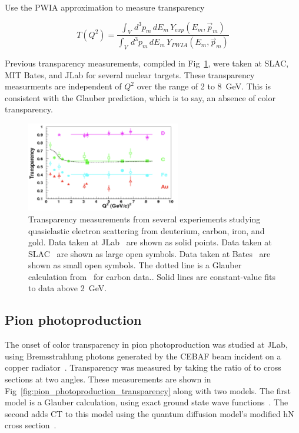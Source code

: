 Use the PWIA approximation to measure transparency

\begin{equation}
    T(Q^2) = \frac{\int_V \, d^3p_m \, dE_m \, Y_{exp}(E_m, \vec{p}_m)}
                  {\int_V \, d^3p_m \, dE_m \, Y_{PWIA}(E_m, \vec{p}_m)}
\end{equation}

Previous transparency measurements, compiled in Fig~\ref{fig:aeep}, were taken
at SLAC, MIT Bates, and JLab for several nuclear targets.
These transparency measurments are independent of $Q^2$ over the range of 2 to
\SI{8}{\giga\electronvolt}.
This is consistent with the Glauber prediction, which is to say, an absence of
color transparency.

\begin{figure}[!h]
    \centering
    \includegraphics[width=0.6\textwidth]{chap2/aeep_transparency.png}
    \caption{Transparency measurements from several experiements studying
             quasielastic electron scattering from deuterium, carbon, iron,
             and gold.
             Data taken at JLab~\cite{Abbot_1998, Garrow_2002, Rohe_2005} are shown as solid points.
             Data taken at SLAC~\cite{Makins_1994, ONeill_1995} are shown as large open symbols.
             Data taken at Bates~\cite{Garino_1992} are shown as small open symbols.
             The dotted line is a Glauber calculation from~\cite{Pandharipande_1992} for carbon data..
             Solid lines are constant-value fits to data above \SI{2}{\giga\electronvolt}.
            }
    \label{fig:aeep}
\end{figure}


\subsection{Pion photoproduction}
The onset of color transparency in pion photoproduction was studied at JLab,
using Bremsstrahlung photons generated by the CEBAF beam incident on a copper
radiator~\cite{Dutta_2003}.
Transparency was measured by taking the ratio of  to  cross sections at two
angles.
These measurements are shown in Fig~\ref{fig:pion_photoproduction_transparency}
along with two models.
The first model is a Glauber calculation, using exact ground state wave
functions~\cite{Arriaga_1995}.
The second adds CT to this model using the quantum diffusion model's modified hN
cross section~\cite{Farrar_1988}.

